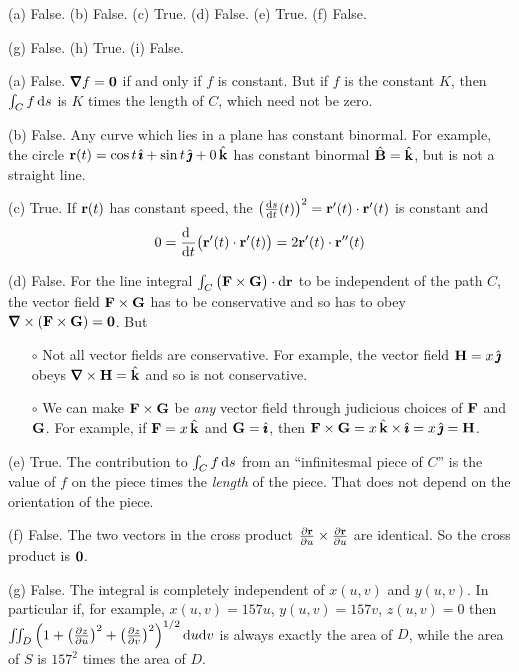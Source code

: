 \begin{answer} 
(a) False.\qquad
(b) False.\qquad
(c) True.\qquad
(d) False.\qquad
(e) True.\qquad
(f) False.

(g) False.\qquad
(h) True.\qquad
(i) False.

\end{answer}

\begin{solution}
(a) False. $\vnabla f=\vZero$ if and only if $f$ is constant. But
if $f$ is the constant $K$, then $\int_C f\,\mathrm{d}s$ is $K$ times the
length of $C$, which need not be zero.

(b) False. Any curve which lies in a plane has constant binormal.
For example, the circle $\mathbf{r}(t) =\cos t\,\hat{\pmb{\imath}} +\sin t\,\hat{\pmb{\jmath}} +0\,\hat{\mathbf{k}}$ 
has constant binormal $\hat{\mathbf{B}}=\hat{\mathbf{k}}$, but is not a straight line.

(c) True. If $\mathbf{r}(t)$ has constant speed, the $\big(\diff{s}{t}(t)\big)^2
=\vr'(t)\cdot\vr'(t)$ is constant and
\begin{align*}
0= \diff{\hfill}{t} \big(\vr'(t)\cdot\vr'(t)\big)
= 2\vr'(t)\cdot\vr''(t)
\end{align*}

(d) False. For the line integral $\int_C\big(\mathbf{F}\times\mathbf{G}\big)\cdot\mathrm{d}\mathbf{r}$ 
to be independent of the path $C$, the vector field $\mathbf{F}\times\mathbf{G}$
has to be conservative and so has to obey $\vnabla\times(\vF\times\vG)=\vZero$.
But
\begin{itemize}\itemsep1pt \parskip0pt  %
\item[$\circ$]
Not all vector fields are conservative. For example, the vector field
$\mathbf{H} = x\,\hat{\pmb{\jmath}}$ obeys $\vnabla\times\vH = \hk$ and so is not conservative.
\item[$\circ$]
We can make $\mathbf{F}\times\mathbf{G}$ be \emph{any} vector field through judicious
choices of $\mathbf{F}$ and $\mathbf{G}$. For example, if $\mathbf{F}= x\,\hat{\mathbf{k}}$ and $\mathbf{G} = \hat{\pmb{\imath}}$, 
then $\mathbf{F}\times\mathbf{G}=x\,\hat{\mathbf{k}}\times\hat{\pmb{\imath}}=x\,\hat{\pmb{\jmath}}=\mathbf{H}$.
\end{itemize}


(e) True. The contribution to $\int_C f\,\mathrm{d}s$ from an
``infinitesmal piece of $C$'' is the value of $f$ on the piece
times the \emph{length} of the piece. That does not depend on the
orientation of the piece.

(f) False. The two vectors in the cross product 
$\frac{\partial\mathbf{r}}{\partial u}\times \frac{\partial\mathbf{r}}{\partial u}$
are identical. So the cross product is $\mathbf{0}$.

(g) False. The integral is completely independent of $x(u,v)$ and $y(u,v)$.
In particular if, for example, $x(u,v)= 157u$, $y(u,v)=157v$, $z(u,v)=0$ then
$\iint_D \left(1+\big(\tfrac{\partial z}{\partial u}\big)^2
             +\big(\tfrac{\partial z}{\partial v}\big)^2\right)^{1/2}                  \mathrm{d}u\mathrm{d}v$
is always exactly the area of $D$, while the area of $S$ is $157^2$ times the
area of $D$.


\end{solution}
